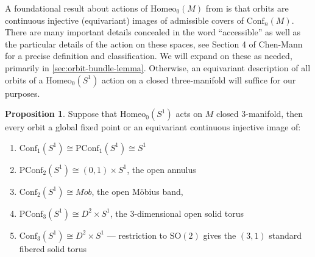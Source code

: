 \documentclass[10pt, oneside]{article}
\newcommand{\SO}[1][2]{\text{SO}(#1)}
\newcommand{\homeo}[1][S^1]{\text{Homeo}_0(#1)}
\newcommand{\conf}[2][S^1]{\text{Conf}_{#2}(#1)}
\newcommand{\pconf}[2][S^1]{\text{PConf}_{#2}(#1)}
\theoremstyle{definition}
\newtheorem{prop}{Proposition}[section]
\theoremstyle{definition}
\begin{document}
A foundational result about actions of $\homeo[M]$ from \cite{chen:StructureTheorems} is that orbits are continuous injective (equivariant) images of admissible covers of $\conf[M]{n}$. There are many important details concealed in the word ``accessible'' as well as the particular details of the action on these spaces, see Section 4 of Chen-Mann\cite{chen:StructureTheorems} for a precise definition and classification. We will expand on these as needed, primarily in \cref{sec:orbit-bundle-lemma}. Otherwise, an equivariant description of all orbits of a $\homeo$ action on a closed three-manifold will suffice for our purposes.
\pagebreak
\begin{prop}\label{prop:orbit-computation}
    Suppose that $\homeo$ acts on $M$ closed 3-manifold, then every orbit a global fixed point or an equivariant continuous injective image of:
    \begin{enumerate}
        \item $\conf[S^1]{1} \cong \pconf[S^1]{1}\cong S^1$
        \item $\pconf[S^1]{2} \cong (0,1)\times S^1$, the open annulus
        \item $\conf[S^1]{2} \cong M\ddot{o}b$, the open M\"{o}bius band,
        \item $\pconf[S^1]{3} \cong D^2\times S^1$, the 3-dimensional open solid torus
        \item $\conf[S^1]{3} \cong D^2\times S^1$ --- restriction to $\SO$ gives the $(3, 1)$ standard fibered solid torus
    \end{enumerate}
\end{prop}
\end{document}
